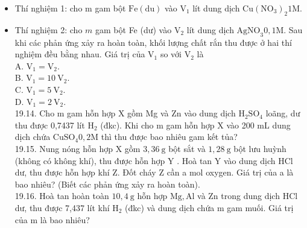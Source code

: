 \documentclass[10pt]{article}
\begin{document}
\begin{itemize}
  \item Thí nghiệm 1: cho m gam bột $\mathrm{Fe}(\mathrm{du})$ vào $\mathrm{V}_{1}$ lít dung dịch $\mathrm{Cu}\left(\mathrm{NO}_{3}\right)_{2} 1 \mathrm{M}$.
  \item Thí nghiệm 2: cho $m$ gam bột Fe (dư) vào $\mathrm{V}_{2}$ lít dung dịch $\mathrm{AgNO}_{3} 0,1 \mathrm{M}$. Sau khi các phản ứng xảy ra hoàn toàn, khối lượng chất rắn thu được ở hai thí nghiệm đều bằng nhau. Giá trị của $\mathrm{V}_{1}$ so với $\mathrm{V}_{2}$ là\\
A. $\mathrm{V}_{1}=\mathrm{V}_{2}$.\\
B. $\mathrm{V}_{1}=10 \mathrm{~V}_{2}$.\\
C. $\mathrm{V}_{1}=5 \mathrm{~V}_{2}$.\\
D. $\mathrm{V}_{1}=2 \mathrm{~V}_{2}$.\\
19.14. Cho m gam hỗn hợp X gồm Mg và Zn vào dung dịch $\mathrm{H}_{2} \mathrm{SO}_{4}$ loãng, dư thu được 0,7437 lít $\mathrm{H}_{2}$ (đkc). Khi cho m gam hỗn hợp X vào 200 mL dung dịch chứa $\mathrm{CuSO}_{4} 0,2 \mathrm{M}$ thì thu được bao nhiêu gam kết tủa?\\
19.15. Nung nóng hỗn hợp X gồm $3,36 \mathrm{~g}$ bột sắt và $1,28 \mathrm{~g}$ bột lưu huỳnh (không có không khí), thu được hỗn hợp Y . Hoà tan Y vào dung dịch HCl dư, thu được hỗn hợp khí Z. Đốt cháy Z cần a mol oxygen. Giá trị của a là bao nhiêu? (Biết các phản ứng xảy ra hoàn toàn).\\
19.16. Hoà tan hoàn toàn $10,4 \mathrm{~g}$ hỗn hợp $\mathrm{Mg}, \mathrm{Al}$ và Zn trong dung dịch HCl dư, thu được 7,437 lít khí $\mathrm{H}_{2}$ (đkc) và dung dịch chứa m gam muối. Giá trị của m là bao nhiêu?
\end{itemize}
\end{document}
